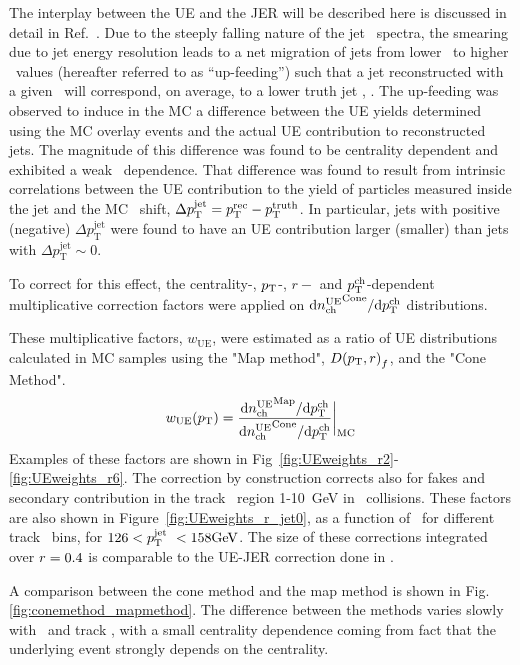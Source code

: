 The interplay between the UE and the JER will be described here is discussed in detail in Ref.~\cite{ATLAS-COM-PHYS-2012-1653}.
Due to the steeply falling nature of the jet \pt\ spectra, the smearing due to jet energy resolution leads to a net migration of jets from lower \pt\ to higher \pt\ values (hereafter referred to as ``up-feeding'') such that a jet reconstructed with a given \pTrec\ will correspond, on average, to a lower truth jet \pT, \avgpttrue.
The up-feeding was observed to induce in the MC a difference between the UE yields determined using the MC overlay events and the actual UE contribution to reconstructed jets.
The magnitude of this difference was found to be centrality dependent and exhibited a weak \pTjet\ dependence.
That difference was found to result from intrinsic correlations between the UE contribution to the yield of particles measured inside the jet and the MC \pTjet\ shift, $\Delta p_{\mathrm{T}}^{\mathrm{jet}}= \mbox{$p_{{\mathrm{T}}}^{\mathrm{rec}}$} - \mbox{$p_{\mathrm{T}}^{\mathrm{truth}}$}$.
 In particular, jets with positive (negative) $\Delta p_{\mathrm{T}}^{\mathrm{jet}}$ were found to have an UE contribution larger (smaller) than jets with $\Delta p_{\mathrm{T}}^{\mathrm{jet}} \sim 0$.
 
 
  To correct for this effect, the centrality-, $\mbox{$p_{{\mathrm{T}}}$}$-, $r-$ and $\mbox{$p_{{\mathrm{T}}}^{\mathrm{ch}}$}$-dependent multiplicative correction factors were applied on $\mathrm{d} \mbox{$n_{\mathrm{ch}}^{\mathrm{UE}}$}^{\mathrm{Cone}}/ \mathrm{d} \mbox{$p_{{\mathrm{T}}}^{\mathrm{ch}}$}$ distributions.

  These multiplicative factors, $w_{\mathrm{UE}}$, were estimated as a ratio of UE distributions calculated in MC samples using the "Map method", $\mbox{$D( \mbox{$p_{\mathrm{T}}$}, r)$}_{f}$, and the "Cone Method".
  \begin{eqnarray}
  w_{\mathrm{UE}} (\mbox{$p_{\mathrm{T}}$}) = \frac{\mathrm{d} \mbox{$n_{\mathrm{ch}}^{\mathrm{UE}}$}^{\mathrm{Map}}/ \mathrm{d} \mbox{$p_{{\mathrm{T}}}^{\mathrm{ch}}$}}{\mathrm{d} \mbox{$n_{\mathrm{ch}}^{\mathrm{UE}}$}^{\mathrm{Cone}}/ \mathrm{d} \mbox{$p_{{\mathrm{T}}}^{\mathrm{ch}}$}}\bigg|_{\mathrm{MC}}
  \end{eqnarray}   
Examples of these factors are shown in Fig~\ref{fig:UEweights_r2}-\ref{fig:UEweights_r6}.
The correction by construction corrects also for fakes and secondary contribution in the track \pT\ region 1-10~GeV in \PbPb\ collisions.
These factors are also shown in Figure~\ref{fig:UEweights_r_jet0}, as a function of \rvar\ for different track \pt\ bins, for $126 < \mbox{$p_{\mathrm{T}}^{\mathrm{jet}}$}\ < 158 \mbox{GeV}$.
 The size of these corrections integrated over $\mbox{$r$} = 0.4$ is comparable to the UE-JER correction done in \cite{PhysRevC.98.024908}.

A comparison between the cone method and the map method is shown in Fig.\ref{fig:conemethod_mapmethod}.
The difference between the methods varies slowly with \ptjet\ and track \pT, with a small centrality dependence coming from fact that the underlying event strongly depends on the centrality.


